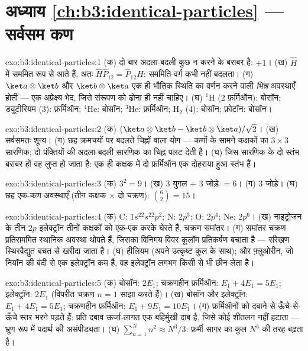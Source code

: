 \section*{अध्याय \ref{ch:b3:identical-particles} --- सर्वसम कण}

\begin{solution}{exo:b3:identical-particles:1}
(क) दो बार अदला-बदली कुछ न करने के बराबर है:  $\pm1$। (ख)
 $\hat H$ में सममित रूप से आते हैं, अतः $\hat H\hat
P_{12} = \hat P_{12}\hat H$: सममिति-वर्ग कभी नहीं बदलता। (ग)
$\ket a\otimes\ket b$ और $\ket b\otimes\ket a$ एक ही भौतिक स्थिति का
वर्णन करने वाली \emph{भिन्न} अवस्थाएँ होतीं --- एक अप्रेक्ष्य भेद, जिसे
संरूपण को ढोना ही नहीं चाहिए। (घ)
$^1$H (2 फ़र्मिऑन): बोसॉन; ड्यूटीरियम (3): फ़र्मिऑन; $^4$He: बोसॉन;
$^3$He: फ़र्मिऑन; H$_2$ (4): बोसॉन; फ़ोटॉन: बोसॉन।
\end{solution}

\begin{solution}{exo:b3:identical-particles:2}
(क) $(\ket a\otimes\ket b - \ket b\otimes\ket a)/\sqrt2$। (ख)
सर्वसमतः शून्य। (ग) छह क्रमचयों पर बदलते चिह्नों वाला योग --- कणों के
सामने कक्षकों का $3\times3$ सारणिक; दो पंक्तियों की अदला-बदली सारणिक
का चिह्न पलट देती है। (घ) जिस सारणिक के दो स्तंभ बराबर हों वह लुप्त हो
जाता है: एक ही कक्षक में दो फ़र्मिऑन एक दोहराया हुआ स्तंभ हैं।
\end{solution}

\begin{solution}{exo:b3:identical-particles:3}
(क) $3^2 = 9$। (ख) $3$ युगल $+$ $3$ जोड़े $= 6$। (ग) $3$ जोड़े।
(घ) छह एक-कण अवस्थाएँ (तीन कक्षक $\times$ दो चक्रण):
$\binom62 = 15$।
\end{solution}

\begin{solution}{exo:b3:identical-particles:4}
(क) C: $1s^22s^22p^2$; N: $2p^3$; O: $2p^4$; Ne: $2p^6$। (ख)
नाइट्रोजन के तीन $2p$ इलेक्ट्रॉन तीनों कक्षकों को एक-एक करके घेरते
हैं, चक्रण समांतर। (ग) समांतर चक्रण प्रतिसममित स्थानिक अवस्था थोपते
हैं, जिसका विनिमय विवर कूलॉम प्रतिकर्षण बचाता है --- संरेखण
स्थिरवैद्युत बचत से खरीदा जाता है। (घ) हीलियम (अपने उत्कृष्ट कुल के
साथ); और फ़्लुओरीन, जो नियॉन की बंदी से एक इलेक्ट्रॉन कम है, वह
इलेक्ट्रॉन लगभग किसी से भी छीन लेता है।
\end{solution}

\begin{solution}{exo:b3:identical-particles:5}
(क) बोसॉन: $2E_1$; चक्रणहीन फ़र्मिऑन: $E_1 + 4E_1 = 5E_1$;
इलेक्ट्रॉन: $2E_1$ (विपरीत चक्रण $n = 1$ साझा करते हैं)। (ख) बोसॉन और
इलेक्ट्रॉन: $E_1 + 4E_1 = 5E_1$; चक्रणहीन फ़र्मिऑन: $E_1 + 9E_1 =
10E_1$। (ग) फ़र्मिऑनों को दबाने से ऊँचे-से-ऊँचे स्तर भरने पड़ते हैं:
प्रति दबाव ऊर्जा-लागत एक बहिर्मुखी दाब है, जिसे कोई शीतलन नहीं हटाता
--- भ्रूण रूप में पदार्थ की असंपीड्यता। (घ)
$\sum_{n=1}^N n^2 \approx N^3/3$: फ़र्मी सागर का कुल
$N^3$ की तरह बढ़ता है।
\end{solution}


